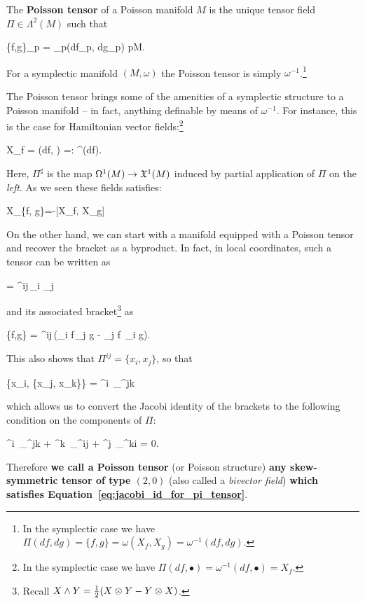 \documentclass[main.tex]{subfiles}
\begin{document}
\begin{definition}
	The \textbf{Poisson tensor} of a Poisson manifold $M$ is the unique tensor field $\Pi \in  \Lambda^2(M)$ such that
	\begin{eqalign}
		\{f,g\}\vert_p = \Pi\vert_p(df\vert_p, dg\vert_p) \quad \forall p\in M.
	\end{eqalign}
\end{definition}

\begin{example}
	For a symplectic manifold $(M, \omega)$ the Poisson tensor is simply $\omega^{-1}$.\footnote{In the symplectic case we have $\Pi(df, dg) = \{f, g\} = \omega(X_f, X_g)=\omega^{-1}(df, dg)$.}
\end{example}

The Poisson tensor brings some of the amenities of a symplectic structure to a Poisson manifold -- in fact, anything definable by means of $\omega^{-1}$. For instance, this is the case for Hamiltonian vector fields:\footnote{In the symplectic case we have $\Pi(df, \bullet) = \omega^{-1}(df, \bullet) = X_f$.}
\begin{eqalign}
\label{eq:ham_vf_from_pi}
	X_f = \Pi(df, \bullet) =: \Pi^\sharp(df).
\end{eqalign}
Here, $\Pi^\sharp$ is the map $\Omega^1(M) \to \mathfrak{X}^1(M)$ induced by partial application of $\Pi$ on the \emph{left}. As we seen these fields satisfies:
\begin{eqalign}
	X_{\{f, g\}}=-[X_f, X_g]
\end{eqalign}

On the other hand, we can start with a manifold equipped with a Poisson tensor and recover the bracket as a byproduct. In fact, in local coordinates, such a tensor can be written as
\begin{eqalign}
	\Pi =  \Pi^{ij}\,\partial_i \wedge \partial_j
\end{eqalign}
and its associated bracket\footnote{Recall $X \wedge Y = \frac12 (X \otimes_{} Y - Y \otimes_{} X)$.} as
\begin{eqalign}
	\{f,g\} =  \Pi^{ij}\,(\partial_i f\,\partial_j g - \partial_j f\, \partial_i g).
\end{eqalign}
This also shows that $\Pi^{ij} = \{x_i, x_j\}$, so that
\begin{eqalign}
	\{x_i, \{x_j, x_k\}\} =  \Pi^{i\ell}\, \partial_\ell \Pi^{jk}
\end{eqalign}
which allows us to convert the Jacobi identity of the brackets to the following condition on the components of $\Pi$:
\begin{eqalign}
\label{eq:jacobi_id_for_pi_tensor}
	\Pi^{i\ell}\, \partial_\ell \Pi^{jk} + \Pi^{k\ell}\, \partial_\ell \Pi^{ij} + \Pi^{j\ell}\, \partial_\ell \Pi^{ki} = 0.
\end{eqalign}
Therefore \textbf{we call a Poisson tensor} (or Poisson structure) \textbf{any skew-symmetric tensor of type $(2, 0)$} (also called a \emph{bivector field}) \textbf{which satisfies Equation~\ref{eq:jacobi_id_for_pi_tensor}}.
\end{document}
